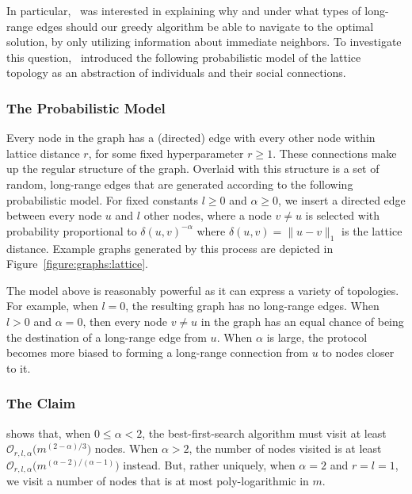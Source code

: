 In particular,~\cite{kleinberg2000sw} was interested in explaining why
and under what types of long-range edges should our greedy algorithm
be able to navigate to the optimal solution, by only utilizing information
about immediate neighbors. To investigate this question,~\cite{kleinberg2000sw}
introduced the following probabilistic model of the lattice topology as an abstraction
of individuals and their social connections.

\subsubsection{The Probabilistic Model}
Every node in the graph has a (directed) edge with every other node within
lattice distance $r$, for some fixed hyperparameter $r \geq 1$. These connections
make up the regular structure of the graph. Overlaid with this structure is a set of
random, long-range edges that are generated according to the following
probabilistic model. For fixed constants $l \geq 0$ and $\alpha \geq 0$,
we insert a directed edge between every node $u$ and $l$ other nodes, where a node
$v \neq u$ is selected with probability proportional to $\delta(u, v)^{-\alpha}$
where $\delta(u, v) = \lVert u - v \rVert_1$ is the lattice distance.
Example graphs generated by this process are depicted in Figure~\ref{figure:graphs:lattice}.

The model above is reasonably powerful as it can express a variety of topologies.
For example, when $l = 0$, the resulting graph has no long-range edges.
When $l > 0$ and $\alpha = 0$, then every node $v \neq u$ in the graph
has an equal chance of being the destination of a long-range edge from $u$.
When $\alpha$ is large, the protocol becomes more biased to forming a long-range connection
from $u$ to nodes closer to it.

\subsubsection{The Claim}
\begin{svgraybox}
\cite{kleinberg2000sw} shows that, when $0 \leq \alpha < 2$,
the best-first-search algorithm must visit at least $\mathcal{O}_{r, l, \alpha}\big(m^{(2 - \alpha)/3}\big)$
nodes. When $\alpha > 2$, the number of nodes visited is at least
$\mathcal{O}_{r, l, \alpha}\big(m^{(\alpha - 2)/(\alpha - 1)} \big)$ instead. But, rather
uniquely, when $\alpha = 2$ and $r = l = 1$, we visit a number of nodes that
is at most poly-logarithmic in $m$.
\end{svgraybox}

